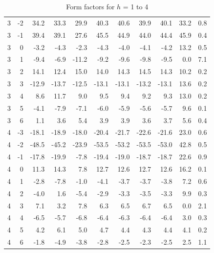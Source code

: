\begin{table}
\begin{tabular}{rrrrrrrrrrr}
3 & -2 & 34.2 & 33.3 & 29.9 & 40.3 & 40.6 & 39.9 & 40.1 & 33.2 & 0.8 \\ 
3 & -1 & 39.4 & 39.1 & 27.6 & 45.5 & 44.9 & 44.0 & 44.4 & 45.9 & 0.4 \\ 
3 & 0 & -3.2 & -4.3 & -2.3 & -4.3 & -4.0 & -4.1 & -4.2 & 13.2 & 0.5 \\ 
3 & 1 & -9.4 & -6.9 & -11.2 & -9.2 & -9.6 & -9.8 & -9.5 & 0.0 & 7.1 \\ 
3 & 2 & 14.1 & 12.4 & 15.0 & 14.0 & 14.3 & 14.5 & 14.3 & 10.2 & 0.2 \\ 
3 & 3 & -12.9 & -13.7 & -12.5 & -13.1 & -13.1 & -13.2 & -13.1 & 13.6 & 0.2 \\ 
3 & 4 & 8.6 & 11.7 & 9.0 & 9.5 & 9.4 & 9.2 & 9.3 & 13.0 & 0.2 \\ 
3 & 5 & -4.1 & -7.9 & -7.1 & -6.0 & -5.9 & -5.6 & -5.7 & 9.6 & 0.1 \\ 
3 & 6 & 1.1 & 3.6 & 5.4 & 3.9 & 3.9 & 3.6 & 3.7 & 5.6 & 0.4 \\ 
4 & -3 & -18.1 & -18.9 & -18.0 & -20.4 & -21.7 & -22.6 & -21.6 & 23.0 & 0.6 \\ 
4 & -2 & -48.5 & -45.2 & -23.9 & -53.5 & -53.2 & -53.5 & -53.0 & 42.8 & 0.5 \\ 
4 & -1 & -17.8 & -19.9 & -7.8 & -19.4 & -19.0 & -18.7 & -18.7 & 22.6 & 0.9 \\ 
4 & 0 & 11.3 & 14.3 & 7.8 & 12.7 & 12.6 & 12.7 & 12.6 & 16.2 & 0.1 \\ 
4 & 1 & -2.8 & -7.8 & -1.0 & -4.1 & -3.7 & -3.7 & -3.8 & 7.2 & 0.6 \\ 
4 & 2 & -4.0 & 1.6 & -5.4 & -2.9 & -3.3 & -3.5 & -3.3 & 9.9 & 0.3 \\ 
4 & 3 & 7.1 & 3.2 & 7.8 & 6.3 & 6.5 & 6.7 & 6.5 & 0.0 & 2.1 \\ 
4 & 4 & -6.5 & -5.7 & -6.8 & -6.4 & -6.3 & -6.4 & -6.4 & 3.0 & 0.3 \\ 
4 & 5 & 4.2 & 6.1 & 5.0 & 4.7 & 4.4 & 4.3 & 4.4 & 4.1 & 0.2 \\ 
4 & 6 & -1.8 & -4.9 & -3.8 & -2.8 & -2.5 & -2.3 & -2.5 & 2.5 & 1.1 \\ 
\hline
\end{tabular}
  \caption{Form factors for $h$ = 1 to 4}
  \label{tb:LAXS_fits}
\end{table}

